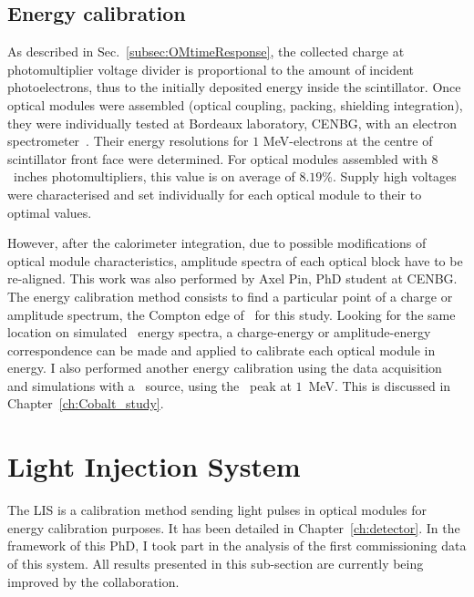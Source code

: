 \subsection{Energy calibration}
\label{sec:comm_energy_calibration}

As described in Sec.~\ref{subsec:OMtimeResponse}, the collected charge at photomultiplier voltage divider is proportional to the amount of incident photoelectrons, thus to the initially deposited energy inside the scintillator.
Once optical modules were assembled (optical coupling, packing, shielding integration), they were individually tested at Bordeaux laboratory, CENBG, with an electron spectrometer~\cite{HuberThesis}.
Their energy resolutions for $1$ MeV-electrons at the centre of scintillator front face were determined.
For optical modules assembled with $8$~inches photomultipliers, this value is on average of $8.19$\%.
Supply high voltages were characterised and set individually for each optical module to their to optimal values.

However, after the calorimeter integration, due to possible modifications of optical module characteristics, amplitude spectra of each optical block have to be re-aligned.
This work was also performed by Axel Pin, PhD student at CENBG.
The energy calibration method consists to find a particular point of a charge or amplitude spectrum, the Compton edge of \Tl\ for this study.
Looking for the same location on simulated \Tl\ energy spectra, a charge-energy or amplitude-energy correspondence can be made and applied to calibrate each optical module in energy.
I also performed another energy calibration using the data acquisition and simulations with a \Co\ source, using the \Co\ peak at $1$~MeV.
This is discussed in Chapter~\ref{ch:Cobalt_study}.


\section{Light Injection System}
\label{sec:LI}

The LIS is a calibration method sending light pulses in optical modules for energy calibration purposes.
It has been detailed in Chapter~\ref{ch:detector}.
In the framework of this PhD, I took part in the analysis of the first commissioning data of this system.
All results presented in this sub-section are currently being improved by the collaboration.

